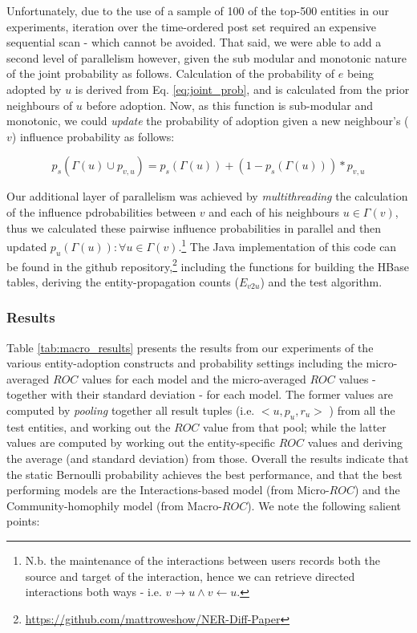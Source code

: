\documentclass[10pt,journal,compsoc]{IEEEtran}
\begin{document}
Unfortunately, due to the use of a sample of 100 of the top-500 entities in our experiments, iteration over the time-ordered post set required an expensive sequential scan - which cannot be avoided.
That said, we were able to add a second level of parallelism however, given the sub modular and monotonic nature of the joint probability as follows.
Calculation of the probability of $e$ being adopted by $u$ is derived from Eq. \ref{eq:joint_prob}, and is calculated from the prior neighbours of $u$ before adoption.
Now, as this function is sub-modular and monotonic, we could \emph{update} the probability of adoption given a new neighbour's ($v$) influence probability as follows:

\begin{equation}
p_s(\Gamma(u) \cup p_{v,u}) = p_s(\Gamma(u)) + (1 - p_s(\Gamma(u))) * p_{v,u}
\end{equation}

Our additional layer of parallelism was achieved by \emph{multithreading} the calculation of the influence pdrobabilities between $v$ and each of his neighbours $u \in \Gamma(v)$, thus we calculated these pairwise influence probabilities in parallel and then updated $p_u(\Gamma(u)) : \forall u \in \Gamma(v)$.\footnote{N.b. the maintenance of the interactions between users records both the source and target of the interaction, hence we can retrieve directed interactions both ways - i.e. $v \rightarrow u \wedge v \leftarrow u$.}
The Java implementation of this code can be found in the github repository,\footnote{\url{https://github.com/mattroweshow/NER-Diff-Paper}} including the functions for building the HBase tables, deriving the entity-propagation counts ($E_{v2u}$) and the test algorithm.

\subsubsection{Results}
Table \ref{tab:macro_results} presents the results from our experiments of the various entity-adoption constructs and probability settings including the micro-averaged $ROC$ values for each model and the micro-averaged $ROC$ values - together with their standard deviation - for each model.
The former values are computed by \emph{pooling} together all result tuples (i.e. $<u, p_u, r_u>$ ) from all the test entities, and working out the $ROC$ value from that pool; while the latter values are computed by working out the entity-specific $ROC$ values and deriving the average (and standard deviation) from those.
Overall the results indicate that the static Bernoulli probability achieves the best performance, and that the best performing models are the Interactions-based model (from Micro-$ROC$) and the Community-homophily model (from Macro-$ROC$).
We note the following salient points:
\end{document}
